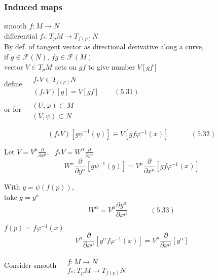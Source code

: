 \documentclass[twoside]{amsart}
\begin{document}
\subsubsection{ Induced maps}

smooth $f:M \to N$ \\

differential $f_*:T_pM \to T_{f(p)}N$ \\
By def. of tangent vector as directional derivative along a curve, \\
\quad if $g \in \mathcal{F}(N)$, $fg \in \mathcal{F}(M)$ \\
vector $V \in T_pM$ acts on $gf$ to give number $V[gf]$ \\

define $\begin{aligned} & \quad \\
  & f_* V \in T_{f(p)}N  \\
  & (f_*V)[g] = V[gf] \quad \quad \, (5.31) \end{aligned}$ \\

or for $\begin{aligned} & \quad \\ 
  & (U,\varphi) \subset M \\ 
  & (V, \psi) \subset N \end{aligned}$ 

\[
(f_*V)[g\psi^{-1}(y) ] \equiv V[gf\varphi^{-1}(x) ] \quad \quad \quad \, (5.32)
\]

Let $V = V^{\mu} \frac{ \partial }{ \partial x^{\mu} }$, \, $f_* V = W^{\alpha} \frac{ \partial }{ \partial y^{\alpha} }$
\[
W^{\alpha} \frac{ \partial }{ \partial y^{\alpha} } [ g\psi^{-1}(y) ] = V^{\mu} \frac{ \partial }{ \partial x^{\mu} }[gf\varphi^{-1}(x) ]
\]

With $y = \psi(f(p))$, \\
take $g= y^{\alpha}$ 
\[
W^{\alpha} = V^{\mu} \frac{ \partial y^{\alpha} }{ \partial x^{\mu} } \quad \quad \quad \, (5.33)
\]

$f(p) = f\varphi^{-1}(x)$
\[
V^{\mu} \frac{ \partial }{ \partial x^{\mu} }[ y^{\alpha} f \varphi^{-1}(x) ] = V^{\mu} \frac{ \partial }{ \partial x^{\mu} }[y^{\alpha} ]
\]


Consider smooth $\begin{aligned} & \quad \\ 
  & f: M \to N \\
  & f_* : T_p M \to T_{f(p)}N \end{aligned}$  
\end{document}
